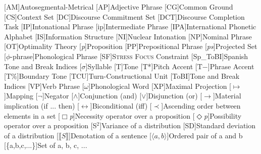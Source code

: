 \largerpage
\begin{multicols}{2}
\begin{acronym}
\itemsep=-1pt
[AM]{Autosegmental-Metrical}
[AP]{Adjective Phrase}
[CG]{Common Ground}
[CS]{Context Set}
[DC]{Discourse Commitment Set}
[DCT]{Discourse Completion Task}
[IP]{Intonational Phrase}
[ip]{Intermediate Phrase}
[IPA]{International Phonetic Alphabet}
[IS]{Information Structure}
[NI]{Nuclear Intonation}
[NP]{Nominal Phrase}
[OT]{Optimality Theory}
[\textit{p}]{Proposition}
[PP]{Prepositional Phrase}
[\textit{ps}]{Projected Set}
[$\phi$-phrase]{Phonological Phrase}
[SF]{\textsc{Stress Focus} Constraint}
[Sp\_ToBI]{Spanish Tone and Break Indices}
[$\sigma$]{Syllable}
[T]{Tone}
[T*]{Pitch Accent}
[T$-$]{Phrase Accent}
[T\protect\%]{Boundary Tone}
[TCU]{Turn-Constructional Unit}
[ToBI]{Tone and Break Indices}
[VP]{Verb Phrase}
[$\omega$]{Phonological Word}
[XP]{Maximal Projection}
[$\longmapsto$]{Mapping}
[$\neg$]{Negator}
[$\wedge$]{Conjunction (and)}
[$\vee$]{Disjunction (or)}
[$\rightarrow$]{Material implication (if ... then)}
[$\leftrightarrow$]{Biconditional (iff)}
[$\prec$]{Ascending order between elements in a set}
[$\Box$\textit{p}]{Necessity operator over a proposition}
[$\Diamond$\textit{p}]{Possibility operator over a proposition}
[S$^2$]{Variance of a distribution}
[SD]{Standard deviation of a distribution}
[$\llbracket S\rrbracket$]{Denotation of a sentence}
[$\langle a,b \rangle$]{Ordered pair of a and b}
[\{a,b,c,...\}]{Set of a, b, c, ...}
\end{acronym}    
\end{multicols}
